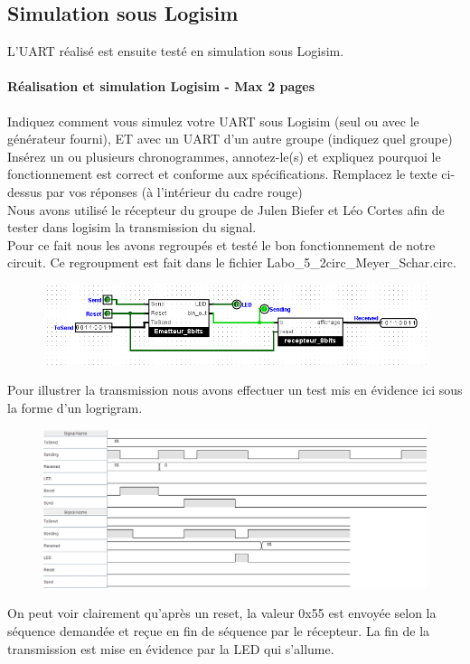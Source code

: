 \documentclass[a4paper]{article} %
\begin{document}
 \subsection{Simulation sous Logisim}
L’UART réalisé est ensuite testé en simulation sous Logisim.
\begin{tcolorbox}[colframe=Monokaimagenta,colback=white, breakable, enhanced]
\paragraph{Réalisation et simulation Logisim - Max 2 pages}
Indiquez comment vous simulez votre UART sous Logisim (seul ou avec le générateur fourni), ET avec un UART d’un autre groupe (indiquez quel groupe)
Insérez un ou plusieurs chronogrammes, annotez-le(s) et expliquez pourquoi le fonctionnement est correct et conforme aux spécifications.
Remplacez le texte ci-dessus par vos réponses (à l’intérieur du cadre rouge)
\\

Nous avons utilisé le récepteur du groupe de Julen Biefer et Léo Cortes afin de tester dans logisim la transmission du signal.\\
Pour ce fait nous les avons regroupés et testé le bon fonctionnement de notre circuit. Ce regroupment est fait dans le fichier Labo\_5\_2circ\_Meyer\_Schar.circ.
\begin{figure}[H]
	\centering
	\includegraphics[scale=0.5]{src/Logigram_TR}
	\label{fig:Logigram_TR}
\end{figure}

Pour illustrer la transmission nous avons effectuer un test mis en évidence ici sous la forme d'un logrigram.
\begin{figure}[H]
	\centering
	\includegraphics[width=\textwidth]{src/chrono_TR1}
	\label{fig:chrono_TR1}
\end{figure}
On peut voir clairement qu'après un reset, la valeur 0x55 est envoyée selon la séquence demandée et reçue en fin de séquence par le récepteur. La fin de la transmission est mise en évidence par la LED qui s'allume.


\end{tcolorbox}
\end{document}
